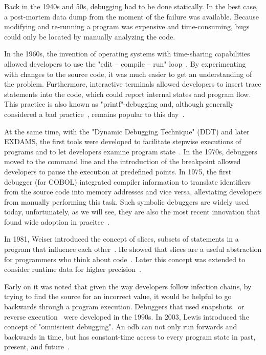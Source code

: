 Back in the 1940s and 50s, debugging had to be done statically.
In the best case, a post-mortem data dump from the moment of the failure was available.
Because modifying and re-running a program was expensive and time-consuming, bugs could only be located by manually analyzing the code.

In the 1960s, the invention of operating systems with time-sharing capabilities allowed developers to use the "edit -- compile -- run" loop~\cite{linton90:the_evolution_of_dbx}.
By experimenting with changes to the source code, it was much easier to get an understanding of the problem.
Furthermore, interactive terminals allowed developers to insert trace statements into the code, which could report internal states and program flow.
This practice is also known as "printf"-debugging and, although generally considered a bad practice~\cite{zeller09:why_programs_fail}, remains popular to this day~\cite{perscheid17:studying_the_advancement}.

At the same time, with the "Dynamic Debugging Technique" (DDT) and later EXDAMS, the first tools were developed to facilitate stepwise executions of programs and to let developers examine program state~\cite{balzer69:exdams_extendable_debugging}.
In the 1970s, debuggers moved to the command line and the introduction of the breakpoint allowed developers to pause the execution at predefined points.
In 1975, the first debugger (for COBOL) integrated compiler information to translate identifiers from the source code into memory addresses and vice versa, alleviating developers from manually performing this task.
Such symbolic debuggers are widely used today, unfortunately, as we will see, they are also the most recent innovation that found wide adoption in pracitce~\cite{perscheid17:studying_the_advancement}.

In 1981, Weiser introduced the concept of slices, subsets of statements in a program that influence each other~\cite{weiser81:program_slicing}. 
He showed that slices are a useful abstraction for programmers who think about code~\cite{weiser82:programmers_use_slices_when}.
Later this concept was extended to consider runtime data for higher precision~\cite{agrawal90:dynamic_program_slicing, korel90:dynamic_slicing_of_computer}.

Early on it was noted that given the way developers follow infection chains, by trying to find the source for an incorrect value, it would be helpful to go backwards through a program execution.
Debuggers that used snapshots~\cite{feldman88:igor_a_system} or reverse execution~\cite{lieberman95:zstep_95_a_reversible} were developed in the 1990s.
In 2003, Lewis introduced the concept of "omniscient debugging".
An \ac{odb} can not only run forwards and backwards in time, but has constant-time access to every program state in past, present, and future~\cite{lewis03:debugging_backwards_in_time}.

